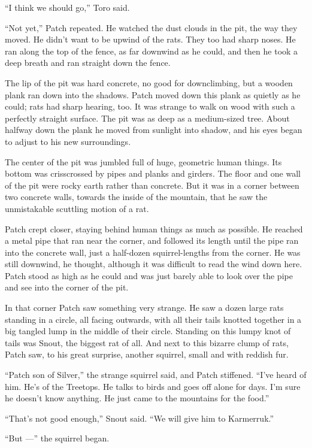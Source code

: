 \documentclass[ebook,oneside,openany,17pt]{memoir}
\begin{document}
“I think we should go,” Toro said.

“Not yet,” Patch repeated. He watched the dust clouds in the pit, the
way they moved. He didn’t want to be upwind of the rats. They too had
sharp noses. He ran along the top of the fence, as far downwind as he
could, and then he took a deep breath and ran straight down the fence.

The lip of the pit was hard concrete, no good for downclimbing, but a
wooden plank ran down into the shadows. Patch moved down this plank as
quietly as he could; rats had sharp hearing, too. It was strange to
walk on wood with such a perfectly straight surface. The pit was as
deep as a medium-sized tree. About halfway down the plank he moved
from sunlight into shadow, and his eyes began to adjust to his new
surroundings.

The center of the pit was jumbled full of huge, geometric human
things. Its bottom was crisscrossed by pipes and planks and
girders. The floor and one wall of the pit were rocky earth rather
than concrete. But it was in a corner between two concrete walls,
towards the inside of the mountain, that he saw the unmistakable
scuttling motion of a rat.

Patch crept closer, staying behind human things as much as
possible. He reached a metal pipe that ran near the corner, and
followed its length until the pipe ran into the concrete wall, just a
half-dozen squirrel-lengths from the corner. He was still downwind, he
thought, although it was difficult to read the wind down here. Patch
stood as high as he could and was just barely able to look over the
pipe and see into the corner of the pit.

In that corner Patch saw something very strange. He saw a dozen large
rats standing in a circle, all facing outwards, with all their tails
knotted together in a big tangled lump in the middle of their
circle. Standing on this lumpy knot of tails was Snout, the biggest
rat of all. And next to this bizarre clump of rats, Patch saw, to his
great surprise, another squirrel, small and with reddish fur.

“Patch son of Silver,” the strange squirrel said, and Patch
stiffened. “I’ve heard of him. He’s of the Treetops. He talks to birds
and goes off alone for days. I’m sure he doesn’t know anything. He
just came to the mountains for the food.”

“That’s not good enough,” Snout said. “We will give him to Karmerruk.”

“But —” the squirrel began.
\end{document}
